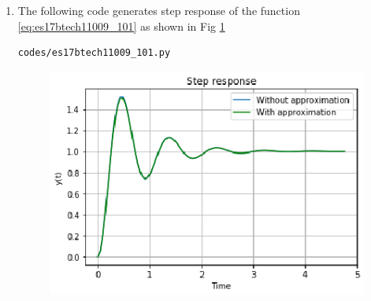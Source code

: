\begin{enumerate}[label=\thesection.\arabic*.,ref=\thesection.\theenumi]
 \item
The following code generates step response of the function \eqref{eq:es17btech11009_101} as shown in Fig \ref{fig:es17btech11009_fig101}
\begin{lstlisting}
codes/es17btech11009_101.py
\end{lstlisting}
\begin{figure}[!h]
\centering
\includegraphics[width=\columnwidth]{./figs/es17btech11009_101.eps}
\caption{}
\label{fig:es17btech11009_fig101}
\end{figure}
  
\end{enumerate}